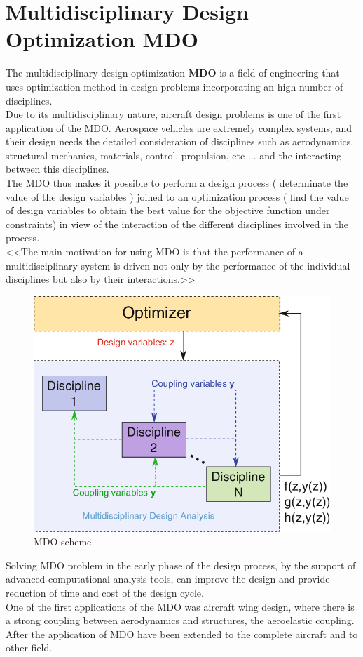 \section{Multidisciplinary Design Optimization MDO}
The multidisciplinary design optimization \textbf{MDO} is a field of engineering that uses optimization method in design problems incorporating an high number of disciplines. \\
Due to its multidisciplinary nature, aircraft design problems is one of the first application of the MDO.
Aerospace vehicles are extremely complex systems, and their design needs the detailed consideration of disciplines such as aerodynamics, structural mechanics, materials, control, propulsion, etc ... and the interacting between this disciplines.\\
The MDO thus makes it possible to perform a design process ( determinate the value of the design variables ) joined to an optimization process ( find the value of design variables to obtain the best value for the objective function under constraints) in view of the interaction of the different disciplines involved in the process.\\
<<The main motivation for using MDO is that the performance of a multidisciplinary system is driven not only by the performance of the individual disciplines but also by their interactions.>> \cite{mart}
\\
\begin{figure}[H]
	\centering
	\includegraphics[width = .5\textwidth]{./Immagini/1_2.png}
	\caption{MDO scheme}
	\label{fig:1_1}
\end{figure}
Solving MDO problem in the early phase of the design process, by the support of advanced computational analysis tools, can improve the design and provide reduction of time and cost of the design cycle.\\
One of the first applications of the MDO was aircraft wing design, where there is a strong coupling between aerodynamics and structures, the aeroelastic coupling. After the application of MDO have been extended to the complete aircraft and to other field.\\
